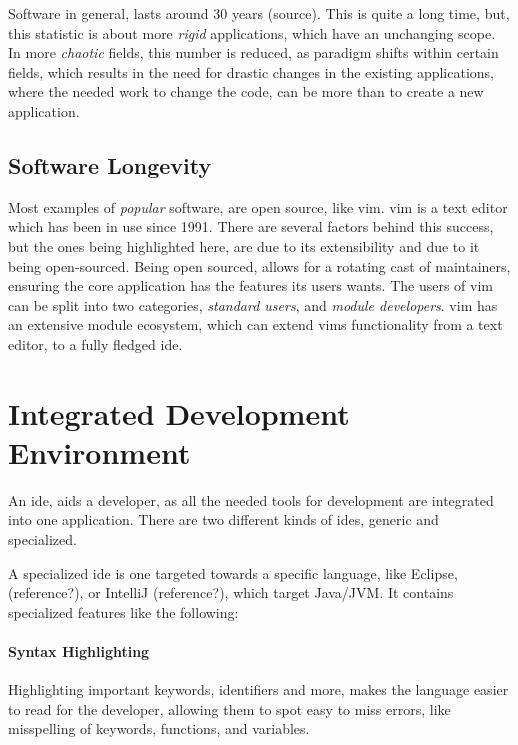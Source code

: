 Software in general, lasts around 30 years (source). This is quite a long time,
but, this statistic is about more \textit{rigid} applications, which have an
unchanging scope. In more \textit{chaotic} fields, this number is reduced, as
paradigm shifts within certain fields, which results in the need for drastic
changes in the existing applications, where the needed work to change the code,
can be more than to create a new application.

\subsection{Software Longevity}

Most examples of \textit{popular} software, are open source, like \gls{vim}.
\gls{vim} is a text editor which has been in use since 1991. There are several
factors behind this success, but the ones being highlighted here, are due to its
extensibility and due to it being open-sourced. Being open sourced, allows for a
rotating cast of maintainers, ensuring the core application has the features its
users wants. The users of \gls{vim} can be split into two categories,
\textit{standard users}, and \textit{module developers}. \gls{vim} has an
extensive module ecosystem, which can extend \gls{vim}s functionality from a
text editor, to a fully fledged \gls{ide}.

\section{Integrated Development Environment} \label{sec:ide}

An \gls{ide}, aids a developer, as all the needed tools for development are
integrated into one application. There are two different kinds of \gls{ide}s,
generic and specialized. 

A specialized \gls{ide} is one targeted towards a specific language, like
Eclipse, (reference?), or IntelliJ (reference?), which target Java/JVM. It
contains specialized features like the following:

\paragraph{Syntax Highlighting} Highlighting important keywords, identifiers
and more, makes the language easier to read for the developer, allowing them to
spot easy to miss errors, like misspelling of keywords, functions, and
variables.

